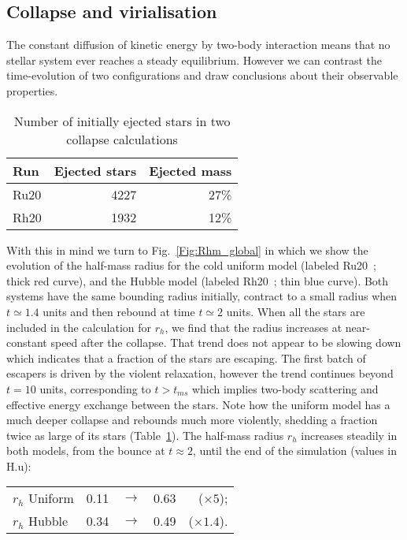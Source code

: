 \subsection{Collapse and virialisation}
\label{Subsec:Collapse}
The constant diffusion of kinetic energy by two-body interaction means that no stellar system ever reaches a steady equilibrium. However we can contrast the time-evolution of two configurations and draw conclusions about their observable properties. 

\begin{table}
\caption{Number of initially ejected stars in two collapse calculations} \label{tab:Ejectedstars}
\begin{tabular}{lrr}
Run & Ejected stars & Ejected mass  \\
\hline
Ru20  &  4227 & 27\% \\
Rh20  &  1932 & 12\% \\
\hline
\end{tabular}
\end{table}


With this in mind  we turn to Fig.~\ref{Fig:Rhm_global} in which we show the evolution of the half-mass radius for the cold uniform model (labeled Ru20~; thick red curve), and the Hubble model (labeled Rh20~; thin blue curve). Both systems have the same bounding radius initially, contract to a small radius when $t \simeq 1.4 $ units and then rebound at time $t \simeq 2 $ units. When all the stars are included in the calculation for $r_h$, we find that the radius increases at near-constant speed after the collapse. That trend does not appear to be slowing down which indicates that a fraction of the stars are escaping. The first batch of escapers is driven by the violent relaxation, however the trend continues beyond $ t = 10$ units, corresponding to $t > t_{ms}$ which implies two-body scattering and effective energy exchange between the stars. Note how the uniform model has a much deeper collapse and rebounds much more violently, shedding a fraction twice as large of its stars (Table~\ref{tab:Ejectedstars}). The half-mass radius $r_h$ increases steadily in both models, from the bounce at $t \approx 2$, until the end of the simulation (values in H.u):  

\begin{tabular}{lllrr}
$r_h$ Uniform & 0.11 &  $\rightarrow$ & 0.63 & ($\times 5$); \\
$r_h$ Hubble & 0.34  &  $\rightarrow$ & 0.49 & ($\times 1.4$). \\
\end{tabular}\\


